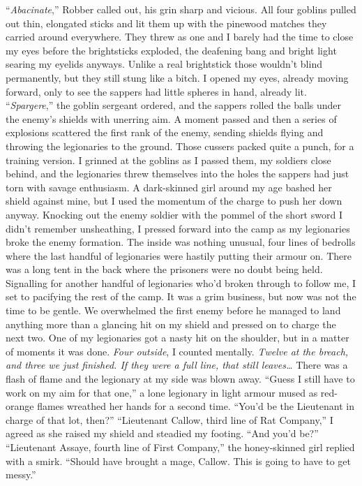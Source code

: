 \documentclass[12pt, openany]{book}
\begin{document}
“\textit{Abacinate},” Robber called out, his grin sharp and vicious.
All four goblins pulled out thin, elongated sticks and lit them up with the pinewood matches they carried around everywhere. They threw as one and I barely had the time to close my eyes before the brightsticks exploded, the deafening bang and bright light searing my eyelids anyways. Unlike a real brightstick those wouldn’t blind permanently, but they still stung like a bitch. I opened my eyes, already moving forward, only to see the sappers had little spheres in hand, already lit.
“\textit{Spargere},” the goblin sergeant ordered, and the sappers rolled the balls under the enemy’s shields with unerring aim.
A moment passed and then a series of explosions scattered the first rank of the enemy, sending shields flying and throwing the legionaries to the ground. Those cussers packed quite a punch, for a training version. I grinned at the goblins as I passed them, my soldiers close behind, and the legionaries threw themselves into the holes the sappers had just torn with savage enthusiasm. A dark-skinned girl around my age bashed her shield against mine, but I used the momentum of the charge to push her down anyway. Knocking out the enemy soldier with the pommel of the short sword I didn’t remember unsheathing, I pressed forward into the camp as my legionaries broke the enemy formation. The inside was nothing unusual, four lines of bedrolls where the last handful of legionaries were hastily putting their armour on. There was a long tent in the back where the prisoners were no doubt being held. Signalling for another handful of legionaries who’d broken through to follow me, I set to pacifying the rest of the camp. It was a grim business, but now was not the time to be gentle. We overwhelmed the first enemy before he managed to land anything more than a glancing hit on my shield and pressed on to charge the next two. One of my legionaries got a nasty hit on the shoulder, but in a matter of moments it was done. \textit{Four outside}, I counted mentally. \textit{Twelve at the breach, and three we just finished. If they were a full line, that still leaves…} There was a flash of flame and the legionary at my side was blown away.
“Guess I still have to work on my aim for that one,” a lone legionary in light armour mused as red-orange flames wreathed her hands for a second time. “You’d be the Lieutenant in charge of that lot, then?”
“Lieutenant Callow, third line of Rat Company,” I agreed as she raised my shield and steadied my footing. “And you’d be?”
“Lieutenant Assaye, fourth line of First Company,” the honey-skinned girl replied with a smirk. “Should have brought a mage, Callow. This is going to have to get messy.”
\end{document}
